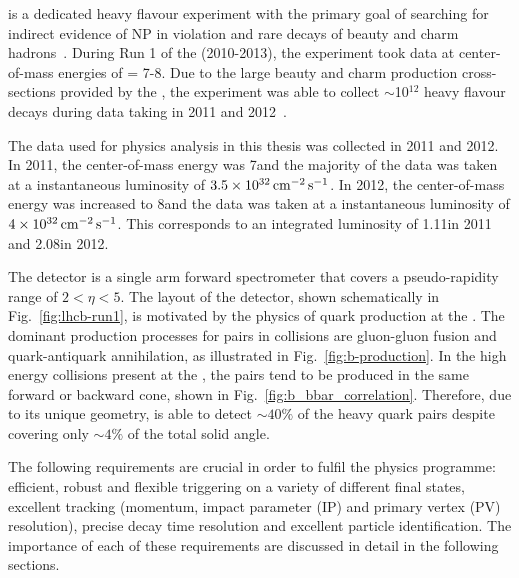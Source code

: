 \lhcb is a dedicated heavy flavour experiment with the primary goal of searching for indirect evidence of NP in \CP violation and rare decays of beauty and charm hadrons~\cite{lhcb}. During Run 1 of the \lhc (2010-2013), the \lhcb experiment took data at center-of-mass energies of \sqs = 7-8\tev. Due to the large beauty and charm production cross-sections provided by the \lhc, the \lhcb experiment was able to collect $\sim$10$^{12}$ heavy flavour decays during data taking in 2011 and 2012~\cite{LHCb-DP-2014-002}.

The data used for physics analysis in this thesis was collected in 2011 and 2012. In 2011, the center-of-mass energy was 7\tev and the majority of the data was taken at a instantaneous luminosity of $3.5\times10^{32}\mathrm{ \,cm}^{-2}\mathrm{{\,s}}^{-1}$. In 2012, the center-of-mass energy was increased to 8\tev and the data was taken at a instantaneous luminosity of $4\times10^{32}\mathrm{ \,cm}^{-2}\mathrm{{\,s}}^{-1}$. This corresponds to an integrated luminosity of 1.11\invfb in 2011 and 2.08\invfb in 2012.

The \lhcb detector is a single arm forward spectrometer that covers a pseudo-rapidity range of $2 < \eta < 5$. The layout of the \lhcb detector, shown schematically in Fig.~\ref{fig:lhcb-run1}, is motivated by the physics of \bquark quark production at the \lhc. The dominant production processes for \bquark\bquarkbar pairs in \proton\proton collisions are gluon-gluon fusion and quark-antiquark annihilation, as illustrated in Fig.~\ref{fig:b-production}. In the high energy collisions present at the \lhc, the \bquark\bquarkbar pairs tend to be produced in the same forward or backward cone, shown in Fig.~\ref{fig:b_bbar_correlation}.  Therefore, due to its unique geometry, \lhcb is able to detect $\sim40\%$ of the heavy quark pairs despite covering only $\sim4\%$ of the total solid angle.

The following requirements are crucial in order to fulfil the \lhcb physics programme: efficient, robust and flexible triggering on a variety of different final states, excellent tracking (momentum, impact parameter (IP) and primary vertex (PV) resolution), precise decay time resolution and excellent particle identification. The importance of each of these requirements are discussed in detail in the following sections.

